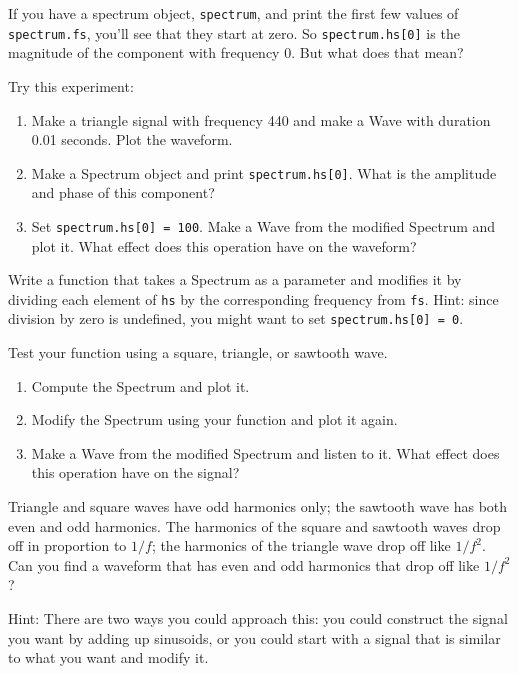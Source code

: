 \documentclass[12pt]{book}
\begin{document}
\begin{exercise}
If you have a spectrum object, {\tt spectrum}, and print the
first few values of {\tt spectrum.fs}, you'll see that they
start at zero.  So {\tt spectrum.hs[0]} is the magnitude
of the component with frequency 0.  But what does that mean?

Try this experiment:

\begin{enumerate}

\item Make a triangle signal with frequency 440 and make
a Wave with duration 0.01 seconds.  Plot the waveform.

\item Make a Spectrum object and print {\tt spectrum.hs[0]}.
What is the amplitude and phase of this component?

\item Set {\tt spectrum.hs[0] = 100}.  Make a Wave from the
modified Spectrum and plot it.  What effect does this operation
have on the waveform?

\end{enumerate}

\end{exercise}


\begin{exercise}
Write a function that takes a Spectrum as a parameter and modifies
it by dividing each element of {\tt hs} by the corresponding frequency
from {\tt fs}.  Hint: since division by zero is undefined, you
might want to set {\tt spectrum.hs[0] = 0}.

Test your function using a square, triangle, or sawtooth wave.

\begin{enumerate}

\item Compute the Spectrum and plot it.

\item Modify the Spectrum using your function and plot it again.

\item Make a Wave from the modified Spectrum and listen to it.  What
effect does this operation have on the signal?

\end{enumerate}

\end{exercise}

\begin{exercise}
Triangle and square waves have odd harmonics only; the sawtooth
wave has both even and odd harmonics.  The harmonics of the
square and sawtooth waves drop off in proportion to $1/f$; the
harmonics of the triangle wave drop off like $1/f^2$.  Can you
find a waveform that has even and odd harmonics that drop off
like $1/f^2$?

Hint: There are two ways you could approach this: you could
construct the signal you want by adding up sinusoids, or you
could start with a signal that is similar to what you want and
modify it.
\end{exercise}
\end{document}
